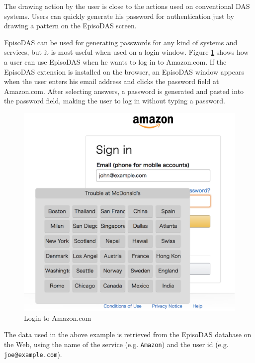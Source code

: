 \documentclass[sigconf]{acmart}
\begin{document}
The drawing action by the user is close to the actions
used on conventional DAS systems.
Users can quickly generate his password for authentication
just by
drawing a pattern on the EpisoDAS screen.

EpisoDAS can be used for generating passwords for any kind of systems and
services, but it is most useful when used on a login window.
Figure \ref{Amazon} shows how a user can use EpisoDAS when
he wants to log in to Amazon.com.
If the EpisoDAS extension is installed on the browser,
an EpisoDAS window appears when the user enters his
email address and clicks the password field at Amazon.com.
After selecting answers, a password is generated and pasted
into the password field, making the user to log in without typing a password.


\begin{figure}[H]
  \includegraphics[width=12cm,bb=0 0 1092 1026]{figures/Amazon.png}
  \caption{Login to Amazon.com}
  \label{Amazon}
\end{figure}

The data used in the above example is retrieved from the EpisoDAS database
on the Web, using the name of the service (e.g. \texttt{Amazon})
and the user id (e.g. \texttt{joe@example.com}).
\end{document}
